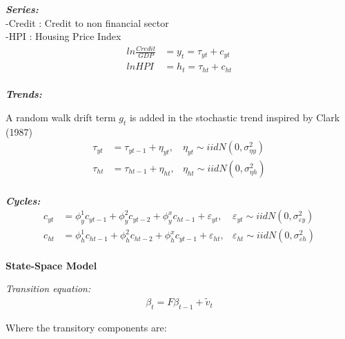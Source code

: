 \documentclass[12pt]{article}
\begin{document}
\begin{outline}[enumerate]
		\textbf{\textit{Series:}} \\
		-Credit : Credit to non financial sector\\
		-HPI : Housing Price Index
		\begin{align}
		ln \frac{Credit}{GDP} &= y_t = \tau_{yt} + c_{yt}
		\\
		ln HPI &= h_t = \tau_{ht} + c_{ht}
		\end{align}
		\\
		\textbf{\textit{Trends:}}
		
		A random walk drift term $g_t$ is added in the stochastic trend inspired by Clark (1987)
		\begin{align}
		\tau_{yt} &= \tau_{yt-1} + \eta_{yt}, &\eta_{yt} \sim iidN(0,\sigma^2_{\eta y})
		\\
		\tau_{ht} &= \tau_{ht-1} + \eta_{ht}, &\eta_{ht} \sim iidN(0,\sigma^2_{\eta h})	
		\end{align}
		\\
		\textbf{\textit{Cycles:}}
		\begin{align}
		c_{yt} &= \phi^1_{y}c_{yt-1}  
		+ \phi^2_{y}c_{yt-2}  
		+ \phi^x_{y}c_{ht-1} 
		+ \varepsilon_{yt},
		&\varepsilon_{yt} \sim iidN(0,\sigma^2_{\varepsilon y})		   
		\\
		c_{ht} &= \phi^1_{h}c_{ht-1}  
		+ \phi^2_{h}c_{ht-2}
		+ \phi^x_{h}c_{yt-1}  
		+ \varepsilon_{ht},
		&\varepsilon_{ht} \sim iidN(0,\sigma^2_{\varepsilon h})
		\end{align}
		\\
		
		
		\textbf{State-Space Model}
		
		\textit{Transition equation:}
		\begin{align}
		\beta_t = F\beta_{t-1} + \tilde{v}_t
		\end{align}
		
		Where the transitory components are:
		

\end{outline}
\end{document}
